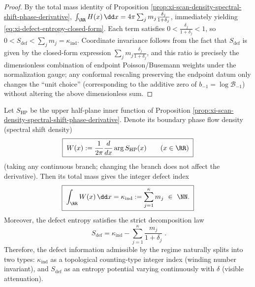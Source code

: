 \begin{proof}
By the total mass identity of Proposition \ref{prop:xi-scan-density-spectral-shift-phase-derivative},
\(
\int_{\RR}H(x)\,\dd x
=4\pi\sum_{j}m_j\frac{\delta_j}{1+\delta_j}
\),
immediately yielding \eqref{eq:xi-defect-entropy-closed-form}.
Each term satisfies \(0<\frac{\delta_j}{1+\delta_j}<1\), so \(0<S_{\mathrm{def}}<\sum_j m_j=\kappa_{\mathrm{ind}}\).
Coordinate invariance follows from the fact that \(S_{\mathrm{def}}\) is given by the closed-form expression \(\sum_j m_j\frac{\delta_j}{1+\delta_j}\), and this ratio is precisely the dimensionless combination of endpoint Poisson/Busemann weights under the normalization gauge; any conformal rescaling preserving the endpoint datum only changes the ``unit choice'' (corresponding to the additive zero of \(b_{-1}=\log\mathcal{B}_{-1}\)) without altering the above dimensionless sum. \qedhere
\end{proof}

\begin{proposition}\label{prop:xi-index-entropy-decomposition}
Let \(S_{\mathrm{HP}}\) be the upper half-plane inner function of Proposition \ref{prop:xi-scan-density-spectral-shift-phase-derivative}.
Denote its boundary phase flow density (spectral shift density)
\begin{equation}\label{eq:xi-spectral-shift-density-W}
\boxed{\;
W(x):=\frac{1}{2\pi}\frac{d}{dx}\arg S_{\mathrm{HP}}(x)\qquad(x\in\RR)\;}
\end{equation}
(taking any continuous branch; changing the branch does not affect the derivative).
Then its total mass gives the integer defect index
\begin{equation}\label{eq:xi-winding-index-kappa-ind}
\boxed{\;
\int_{\RR}W(x)\,\dd x=\kappa_{\mathrm{ind}}:=\sum_{j=1}^{\kappa}m_j\ \in\ \NN.\;}
\end{equation}
Moreover, the defect entropy satisfies the strict decomposition law
\begin{equation}\label{eq:xi-defect-entropy-index-decomposition}
\boxed{\;
S_{\mathrm{def}}
=\kappa_{\mathrm{ind}}-\sum_{j=1}^{\kappa}\frac{m_j}{1+\delta_j}\; }.
\end{equation}
Therefore, the defect information admissible by the regime naturally splits into two types: \(\kappa_{\mathrm{ind}}\) as a topological counting-type integer index (winding number invariant), and \(S_{\mathrm{def}}\) as an entropy potential varying continuously with \(\delta\) (visible attenuation).
\end{proposition}


